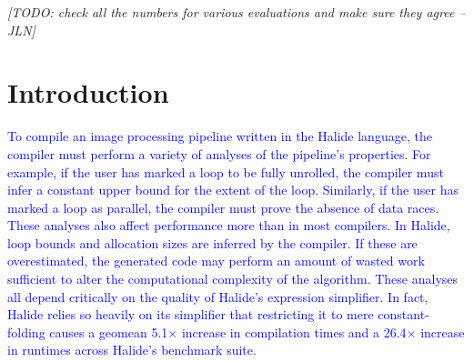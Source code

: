 \documentclass[acmsmall,review]{acmart}\settopmatter{printfolios=true,printccs=false,printacmref=false}
\newcommand{\jln}[1]{\textcolor{uwpurple}{\textit{[{#1} --JLN]}}}
\newcommand{\modified}[1]{\textcolor{red}{{#1}}}
\newcommand{\modifiedagain}[1]{\textcolor{blue}{{#1}}}
\begin{document}




\maketitle


\jln{TODO: check all the numbers for various evaluations and make sure they agree}
\section{Introduction}
\label{sec:introduction}
\modifiedagain{To compile an image processing pipeline written in the
  Halide language, the compiler must perform a variety of analyses of
  the pipeline's properties. For example, if the user has marked a
  loop to be fully unrolled, the compiler must infer a constant upper
  bound for the extent of the loop. Similarly, if the user has marked
  a loop as parallel, the compiler must prove the absence of data
  races. These analyses also affect performance more than in most
  compilers. In Halide, loop bounds and allocation sizes are inferred
  by the compiler. If these are overestimated, the generated code may
  perform an amount of wasted work sufficient to alter the
  computational complexity of the algorithm. These analyses all depend
  critically on the quality of Halide's expression simplifier. In
  fact, Halide relies so heavily on its simplifier that restricting it
  to mere constant-folding causes a geomean 5.1$\times$ increase in
  compilation times and a 26.4$\times$ increase in runtimes across
  Halide's benchmark suite.  }

\end{document}
